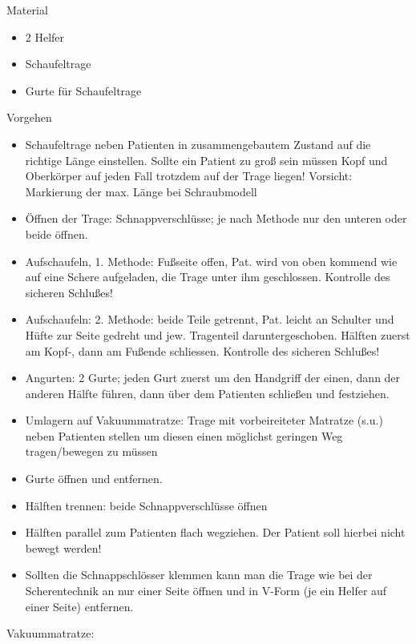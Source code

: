\documentclass{article}
\begin{document}
Material

\begin{itemize}
\item 2 Helfer

\item Schaufeltrage

\item Gurte f\"ur Schaufeltrage

\end{itemize}
Vorgehen

\begin{itemize}
\item Schaufeltrage neben Patienten in zusammengebautem Zustand auf die
richtige L\"ange einstellen. Sollte ein Patient zu gro{\ss} sein
m\"ussen Kopf und Oberk\"orper auf jeden Fall trotzdem auf der Trage
liegen! Vorsicht: Markierung der max. L\"ange bei Schraubmodell

\item \"Offnen der Trage: Schnappverschl\"usse; je nach Methode nur den
unteren oder beide \"offnen.

\item Aufschaufeln, 1. Methode: Fu{\ss}seite offen, Pat. wird von oben
kommend wie auf eine Schere aufgeladen, die Trage unter ihm
geschlossen. Kontrolle des sicheren Schlu{\ss}es!

\item Aufschaufeln: 2. Methode: beide Teile getrennt, Pat. leicht an
Schulter und H\"ufte zur Seite gedreht und jew. Tragenteil
daruntergeschoben. H\"alften zuerst am Kopf-, dann am Fu{\ss}ende
schliessen. Kontrolle des sicheren Schlu{\ss}es!

\item Angurten: 2 Gurte; jeden Gurt zuerst um den Handgriff der einen,
dann der anderen H\"alfte f\"uhren, dann \"uber dem Patienten
schlie{\ss}en und festziehen.

\item Umlagern auf Vakuummatratze: Trage mit vorbeireiteter Matratze
(s.u.) neben Patienten stellen um diesen einen m\"oglichst geringen Weg
tragen/bewegen zu m\"ussen

\item Gurte \"offnen und entfernen.

\item H\"alften trennen: beide Schnappverschl\"usse \"offnen

\item H\"alften parallel zum Patienten flach wegziehen. Der Patient soll
hierbei nicht bewegt werden!

\item Sollten die Schnappschl\"osser klemmen kann man die Trage wie bei
der Scherentechnik an nur einer Seite \"offnen und in V-Form (je ein
Helfer auf einer Seite) entfernen.

\end{itemize}
Vakuummatratze:
\end{document}
